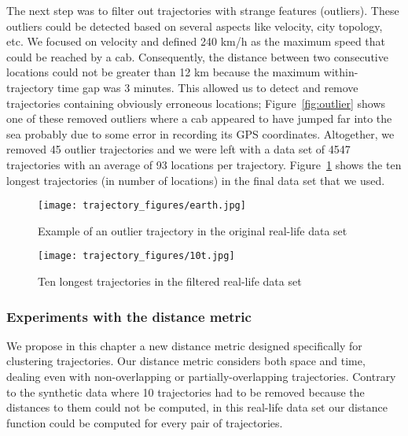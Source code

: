 The next step was to filter out trajectories with strange features
(outliers). These outliers could be detected
based on several aspects like velocity, city topology, etc.
We focused on velocity and defined 240 km/h as the maximum speed that could
be reached by a cab. Consequently, the distance between
two consecutive locations could not be greater than 12 km because the maximum
within-trajectory time gap was 3 minutes. This allowed us to
detect and remove trajectories containing obviously erroneous locations;
Figure~\ref{fig:outlier} shows one of
these removed outliers where a cab appeared to have
jumped far into the sea probably due
to some error in recording its GPS coordinates.
Altogether, we removed 45 outlier trajectories and we were left
with a data set of 4547 trajectories with an average of
93 locations per trajectory.
Figure~\ref{fig:ten_trajectories} shows the ten longest
trajectories (in number of locations) in the final data set that we used.


\begin{figure}[!ht]
\begin{minipage}[b]{0.5\linewidth}
\centering
\texttt{[image: trajectory\_figures/earth.jpg]}
\caption{Example of an outlier trajectory in the original real-life data set}
\label{fig:outlier}
\end{minipage}
\hspace{0.5cm}
\begin{minipage}[b]{0.5\linewidth}
\centering
\texttt{[image: trajectory\_figures/10t.jpg]}
\caption{Ten longest trajectories in the filtered real-life data set}
\label{fig:ten_trajectories}
\end{minipage}
\end{figure}



\subsubsection{Experiments with the distance metric}

We propose in this chapter
a new distance metric designed specifically for clustering
trajectories. Our distance metric considers both space and time,
dealing even with non-overlapping or partially-overlapping trajectories.
Contrary to the synthetic data where 10
trajectories had to be removed because the distances
to them could not be computed,
in this real-life data set our distance function
could be computed for every pair of trajectories.

